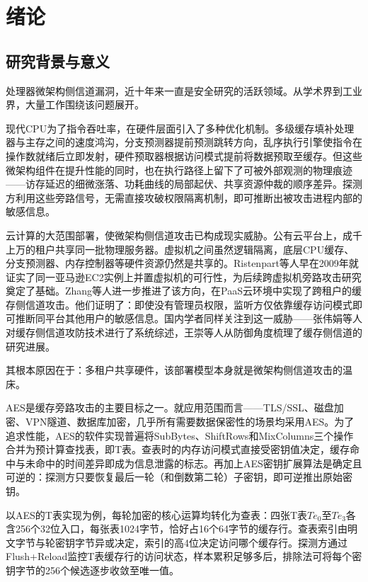 \chapter{绪论}

\section{研究背景与意义}

处理器微架构侧信道漏洞，近十年来一直是安全研究的活跃领域。从学术界到工业界，大量工作围绕该问题展开。

现代CPU为了指令吞吐率，在硬件层面引入了多种优化机制。多级缓存填补处理器与主存之间的速度鸿沟，分支预测器提前预测跳转方向，乱序执行引擎使指令在操作数就绪后立即发射，硬件预取器根据访问模式提前将数据预取至缓存。但这些微架构组件在提升性能的同时，也在执行路径上留下了可被外部观测的物理痕迹——访存延迟的细微涨落、功耗曲线的局部起伏、共享资源仲裁的顺序差异。探测方利用这些旁路信号，无需直接攻破权限隔离机制，即可推断出被攻击进程内部的敏感信息。

云计算的大范围部署，使微架构侧信道攻击已构成现实威胁。公有云平台上，成千上万的租户共享同一批物理服务器。虚拟机之间虽然逻辑隔离，底层CPU缓存、分支预测器、内存控制器等硬件资源仍然是共享的。Ristenpart等人早在2009年就证实了同一亚马逊EC2实例上并置虚拟机的可行性\cite{Ristenpart2009}，为后续跨虚拟机旁路攻击研究奠定了基础。Zhang等人进一步推进了该方向，在PaaS云环境中实现了跨租户的缓存侧信道攻击\cite{Zhang2014}。他们证明了：即使没有管理员权限，监听方仅依靠缓存访问模式即可推断同平台其他用户的敏感信息。国内学者同样关注到这一威胁——张伟娟等人对缓存侧信道攻防技术进行了系统综述\cite{ZhangWJ2023}，王崇等人从防御角度梳理了缓存侧信道的研究进展\cite{WangC2021}。

其根本原因在于：多租户共享硬件，该部署模型本身就是微架构侧信道攻击的温床。

AES是缓存旁路攻击的主要目标之一。就应用范围而言——TLS/SSL、磁盘加密、VPN隧道、数据库加密，几乎所有需要数据保密性的场景均采用AES\cite{NIST2001}。为了追求性能，AES的软件实现普遍将SubBytes、ShiftRows和MixColumns三个操作合并为预计算查找表，即T表\cite{Osvik2006}。查表时的内存访问模式直接受密钥值决定，缓存命中与未命中的时间差异即成为信息泄露的标志。再加上AES密钥扩展算法是确定且可逆的：探测方只要恢复最后一轮（和倒数第二轮）子密钥，即可逆推出原始密钥。

以AES的T表实现为例，每轮加密的核心运算均转化为查表：四张T表$Te_0$至$Te_3$各含256个32位入口，每张表1024字节，恰好占16个64字节的缓存行。查表索引由明文字节与轮密钥字节异或决定，索引的高4位决定访问哪个缓存行。探测方通过Flush+Reload监控T表缓存行的访问状态，样本累积足够多后，排除法可将每个密钥字节的256个候选逐步收敛至唯一值。

